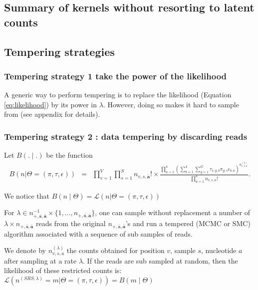 \documentclass{article}
\newcommand\indexsum[1]{\mathbf{\bar{#1}}}
\begin{document}
\subsection{Summary of kernels without resorting to latent counts}




\subsection{Tempering strategies}



\subsubsection{Tempering strategy 1 take the power of the likelihood}
A generic way to perform tempering is to replace the likelihood (Equation \eqref{eq:likelihood}) by its power in $\lambda$. However, doing so makes it hard to sample from (see appendix for details).


\subsubsection{Tempering strategy 2 : data tempering by discarding reads}

Let $B(.\mid.)$ be the function 
\begin{eqnarray}
    B\left(n|\Theta=(\pi, \tau,\epsilon) \right) &=& \prod_{v=1}^{V} \prod_{s = 1}^{S} n_{v,s,\indexsum{a}}!\times\frac{\prod_{a = 1}^{4} \left(\sum_{b=1}^{4} \sum_{g = 1}^{G} \tau_{v,g,b} \pi_{g,s} \epsilon_{b,a} \right)^{n_{v,s,a}^{(\lambda)}}}{\prod_{a = 1}^{4}n_{v,s,a}!}. \label{eq:tempered1}
\end{eqnarray}

We notice that $B(n\mid \Theta)=\mathcal{L}\left(n| \Theta=(\pi, \tau,\epsilon) \right)$

For $\lambda\in n_{+,\indexsum{s},\indexsum{a}}^{-1}\times \{1,\ldots,n_{+,\indexsum{s},\indexsum{a}}\}$, one can sample without replacement a number of $\lambda \times n_{+,\indexsum{s},\indexsum{a}}$ reads from the original $n_{+,\indexsum{s},\indexsum{a}}$'s and run a tempered (MCMC or SMC) algorithm associated with a sequence of sub samples of reads.

We denote by $n_{v,s,a}^{(\lambda)}$ the counts obtained for position $v$, sample $s$, nucleotide $a$ after sampling at a rate $\lambda$.
If the reads are sub sampled at random, then the likelihood of these restricted counts is:
  $\mathcal{L}\left(n^{(SRS,\lambda)}=m | \Theta=(\pi, \tau,\epsilon) \right)=B(m\mid \Theta)$
\end{document}
